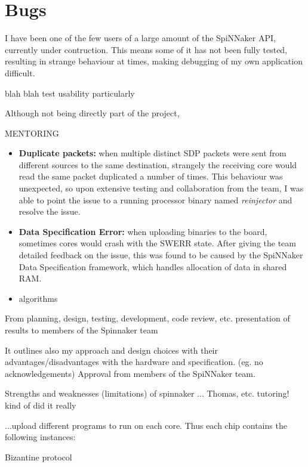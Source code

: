 \section{Bugs}
I have been one of the few users of a large amount of the SpiNNaker API, currently under contruction. This means some of it has not been fully tested, resulting in strange behaviour at times, making debugging of my own application difficult.

blah blah test usability
particularly

Although not being directly part of the project, 

MENTORING

\begin{itemize}
\item \textbf{Duplicate packets:} when multiple distinct SDP packets were sent from different sources to the same destination, strangely the receiving core would read the same packet duplicated a number of times. This behaviour was unexpected, so upon extensive testing and collaboration from the team, I was able to point the issue to a running processor binary named \textit{reinjector} and resolve the issue. 

\item \textbf{Data Specification Error:} when uploading binaries to the board, sometimes cores would crash with the SWERR state. After giving the team detailed feedback on the issue, this was found to be caused by the SpiNNaker Data Specification framework, which handles allocation of data in shared RAM.

\item algorithms

\end{itemize}

From planning, design, testing, development, code review, etc. presentation of results to members of the Spinnaker team

It outlines also my approach and design choices with their advantages/disadvantages with the hardware and specification. (eg. no acknowledgements)
Approval from members of the SpiNNaker team.

Strengths and weaknesses (limitations) of spinnaker
...
Thomas, etc.
tutoring! kind of did it really

...upload different programs to run on each core.
Thus each chip contains the following instances: 

Bizantine protocol
